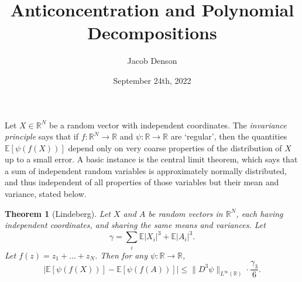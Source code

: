 \documentclass{article}
\title{Anticoncentration and Polynomial Decompositions}
\author{Jacob Denson}
\date{September 24th, 2022}
\theoremstyle{plain}
\newtheorem{theorem}{Theorem}
\theoremstyle{definition}
\begin{document}
\maketitle

Let $X \in \mathbb{R}^N$ be a random vector with independent coordinates. The \emph{invariance principle} says that if $f: \mathbb{R}^N \to \mathbb{R}$ and $\psi: \mathbb{R} \to \mathbb{R}$ are `regular', then the quantities $\mathbb{E}[\psi(f(X))]$ depend only on very coarse properties of the distribution of $X$ up to a small error. A basic instance is the central limit theorem, which says that a sum of independent random variables is approximately normally distributed, and thus independent of all properties of those variables but their mean and variance, stated below.

\begin{theorem}[Lindeberg]
    Let $X$ and $A$ be random vectors in $\mathbb{R}^N$, each having independent coordinates, and sharing the same means and variances. Let
    \[ \gamma = \sum_i \mathbb{E} |X_i|^3 + \mathbb{E} |A_i|^3. \]
    Let $f(z) = z_1 + \dots + z_N$. Then for any $\psi: \mathbb{R} \to \mathbb{R}$,
    \[ |\mathbb{E}[\psi(f(X))] - \mathbb{E}[\psi(f(A))]| \leq \| D^3 \psi \|_{L^\infty(\mathbb{R})} \cdot \frac{\gamma_3}{6}. \]
\end{theorem}
\end{document}
